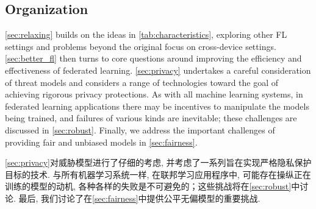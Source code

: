 \subsection{Organization}
\cref{sec:relaxing} builds on the ideas in \cref{tab:characteristics}, exploring other FL settings and problems beyond the original focus on cross-device settings. \cref{sec:better_fl} then turns to core questions around improving the efficiency and effectiveness of federated learning.
%
\cref{sec:privacy} undertakes a careful consideration of threat models and considers a range of technologies toward the goal of achieving rigorous privacy protections. As with all machine learning systems, in federated learning applications there may be incentives to manipulate the models being trained, and failures of various kinds are inevitable; these challenges are discussed in \cref{sec:robust}. Finally, we address the important challenges of providing fair and unbiased models in \cref{sec:fairness}.

\cref{sec:privacy}对威胁模型进行了仔细的考虑, 并考虑了一系列旨在实现严格隐私保护目标的技术. 与所有机器学习系统一样, 在联邦学习应用程序中, 可能存在操纵正在训练的模型的动机, 各种各样的失败是不可避免的；这些挑战将在\cref{sec:robust}中讨论. 最后, 我们讨论了在\cref{sec:fairness}中提供公平无偏模型的重要挑战. 

\pagebreak